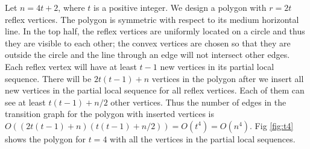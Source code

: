 \documentclass[]{styles/svproc}  %
\begin{document}
Let $n = 4t+2$, where $t$ is a positive integer. We design a polygon with
$r = 2t$ reflex vertices. The polygon is symmetric with respect to its medium
horizontal line. In the top half, the reflex vertices are uniformly located on a
circle and thus they are visible to each other; the convex vertices are chosen
so that they are outside the circle and the line through an edge will not
intersect other edges. Each reflex vertex will have at least $t-1$ new
vertices in its partial local sequence. There will be $2t(t-1)+n$
vertices in the polygon after we insert all new vertices in the partial local
sequence for all reflex vertices. Each of them can see at least $t(t-1)+n/2$
other vertices. Thus the number of edges in the transition graph for the
polygon with inserted vertices is
$O ((2t(t-1)+n)(t(t-1)+n/2)) = O(t^4) = O(n^4)$.
Fig \ref{fig:t4} shows the polygon for $t = 4$ with all the
vertices in the partial local sequences. %
\end{document}
